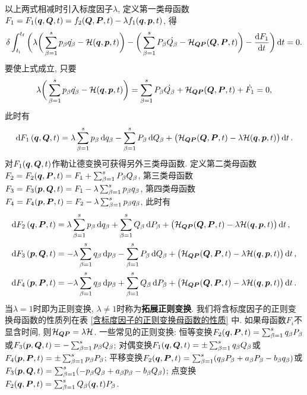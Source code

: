 以上两式相减时引入标度因子$ \lambda $, 定义第一类母函数$ F_1=F_1(\vb*{q},\vb*{Q},t)=f_2(\vb*{Q},\vb*{P},t)-\lambda f_1(\vb*{q},\vb*{p},t) $, 得
\begin{equation*}
    \var{\int_{t_{\mathrm{i}}}^{t_{\mathrm{f}}} \bigg(\lambda \bigg(\sum_{\beta=1}^s p_{\beta}\dot{q_{\beta}} - \mathcal{H}(\vb*{q},\vb*{p},t)\bigg) - \bigg(\sum_{\beta=1}^s P_{\beta}\dot{Q_{\beta}} - \mathcal{H}_{\vb*{Q}\vb*{P}}(\vb*{Q},\vb*{P},t)\bigg) - \dv{F_1}{t} \bigg) \dd{t}}=0.
\end{equation*}
要使上式成立, 只要
\begin{equation*}
    \lambda \bigg(\sum_{\beta=1}^s p_{\beta}\dot{q_{\beta}} - \mathcal{H}(\vb*{q},\vb*{p},t)\bigg) = \sum_{\beta=1}^s P_{\beta}\dot{Q_{\beta}} + \mathcal{H}_{\vb*{Q}\vb*{P}}(\vb*{Q},\vb*{P},t) + \dot{F_1} = 0,
\end{equation*}
此时有
\begin{equation*}
    \dd{F_1}(\vb*{q},\vb*{Q},t) = \lambda \sum_{\beta=1}^s p_{\beta} \dd{q_{\beta}} - \sum_{\beta=1}^s P_{\beta} \dd{Q_{\beta}} + \big(\mathcal{H}_{\vb*{Q}\vb*{P}}(\vb*{Q},\vb*{P},t) - \lambda \mathcal{H}(\vb*{q},\vb*{p},t)\big) \dd{t}.
\end{equation*}
对$ F_1(\vb*{q},\vb*{Q},t) $作勒让德变换可获得另外三类母函数. 定义第二类母函数$ F_2=F_2(\vb*{q},\vb*{P},t)=F_1+\sum_{\beta=1}^s P_{\beta}Q_{\beta} $, 第三类母函数$ F_3=F_3(\vb*{p},\vb*{Q},t)=F_1-\lambda\sum_{\beta=1}^s p_{\beta}q_{\beta} $, 第四类母函数$ F_4=F_4(\vb*{p},\vb*{P},t)=F_2-\lambda\sum_{\beta=1}^s p_{\beta}q_{\beta} $, 此时有
\begin{align*}
    \dd{F_2}(\vb*{q},\vb*{P},t) &= \lambda \sum_{\beta=1}^s p_{\beta} \dd{q_{\beta}} + \sum_{\beta=1}^s Q_{\beta} \dd{P_{\beta}} + \big(\mathcal{H}_{\vb*{Q}\vb*{P}}(\vb*{Q},\vb*{P},t) - \lambda \mathcal{H}(\vb*{q},\vb*{p},t)\big) \dd{t},\\
    \dd{F_3}(\vb*{p},\vb*{Q},t) &= -\lambda \sum_{\beta=1}^s q_{\beta} \dd{p_{\beta}} - \sum_{\beta=1}^s P_{\beta} \dd{Q_{\beta}} + \big(\mathcal{H}_{\vb*{Q}\vb*{P}}(\vb*{Q},\vb*{P},t) - \lambda \mathcal{H}(\vb*{q},\vb*{p},t)\big) \dd{t},\\
    \dd{F_4}(\vb*{p},\vb*{P},t) &= - \lambda \sum_{\beta=1}^s q_{\beta} \dd{p_{\beta}} + \sum_{\beta=1}^s Q_{\beta} \dd{P_{\beta}} + \big(\mathcal{H}_{\vb*{Q}\vb*{P}}(\vb*{Q},\vb*{P},t) - \lambda \mathcal{H}(\vb*{q},\vb*{p},t)\big) \dd{t}.
\end{align*}
当$ \lambda=1 $时即为正则变换, $ \lambda \neq 1 $时称为\textbf{拓展正则变换}. 我们将含标度因子的正则变换母函数的性质列在表 \ref{含标度因子的正则变换母函数的性质} 中. 如果母函数$ F_i $不显含时间, 则$ \mathcal{H}_{\vb*{Q}\vb*{P}}=\lambda\mathcal{H} $. 一些常见的正则变换: 恒等变换$ F_2(\vb*{q},\vb*{P},t)=\sum_{\beta=1}^s q_{\beta}P_{\beta} $或$ F_3(\vb*{p},\vb*{Q},t)=-\sum_{\beta=1}^s p_{\beta}Q_{\beta} $; 对偶变换$ F_1(\vb*{q},\vb*{Q},t)=\pm\sum_{\beta=1}^s q_{\beta}Q_{\beta} $或$ F_4(\vb*{p},\vb*{P},t)=\pm\sum_{\beta=1}^s p_{\beta}P_{\beta} $; 平移变换$ F_2(\vb*{q},\vb*{P},t)=\sum_{\beta=1}^s (q_{\beta}P_{\beta}+a_{\beta}P_{\beta}-b_{\beta}q_{\beta}) $或$ F_3(\vb*{p},\vb*{Q},t)=\sum_{\beta=1}^s (-p_{\beta}Q_{\beta}+a_{\beta}p_{\beta}-b_{\beta}Q_{\beta}) $; 点变换$ F_2(\vb*{q},\vb*{P},t)=\sum_{\beta=1}^s Q_{\beta}(\vb*{q},t) P_{\beta} $.
